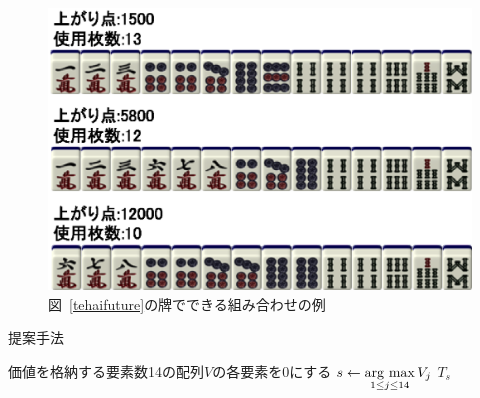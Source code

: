 \begin{figure}[t]
	\begin{center}
		\includegraphics{fig/excombination.eps}
	\end{center}
	\caption{図~\ref{tehaifuture}の牌でできる組み合わせの例}
	\label{excombination}
\end{figure}

\begin{algorithm}[t]
\caption{提案手法}
\label{proposal}
	価値を格納する要素数14の配列$V$の各要素を0にする\;
	$s \leftarrow \mathop{\rm arg~max}\limits_{1 \le j \le 14} V_j$\;
	\Return $T_s$\;
\end{algorithm}
